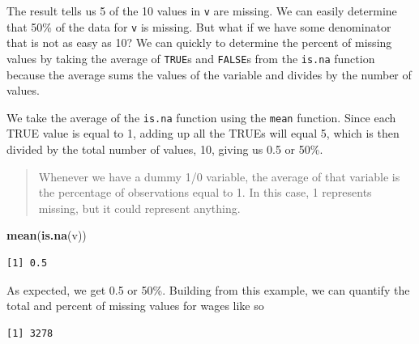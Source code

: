 \documentclass[
]{book}
\makeatletter
\newenvironment{Shaded}{\begin{snugshade}}{\end{snugshade}}
\newcommand{\FunctionTok}[1]{\textcolor[rgb]{0.27,0.27,0.27}{\textbf{#1}}}
\newcommand{\NormalTok}[1]{#1}
\newcommand{\SpecialCharTok}[1]{\textcolor[rgb]{0.43,0.43,0.43}{\textbf{#1}}}
\newenvironment{kframe}{%
\medskip{}
\setlength{\fboxsep}{.8em}
 \def\at@end@of@kframe{}%
 \ifinner\ifhmode%
  \def\at@end@of@kframe{\end{minipage}}%
  \begin{minipage}{\columnwidth}%
 \fi\fi%
 \def\FrameCommand##1{\hskip\@totalleftmargin \hskip-\fboxsep
 \colorbox{shadecolor}{##1}\hskip-\fboxsep
     \hskip-\linewidth \hskip-\@totalleftmargin \hskip\columnwidth}%
 \MakeFramed {\advance\hsize-\width
   \@totalleftmargin\z@ \linewidth\hsize
   \@setminipage}}%
 {\par\unskip\endMakeFramed%
 \at@end@of@kframe}
\renewenvironment{Shaded}{\begin{kframe}}{\end{kframe}}
\makeatother
\begin{document}
The result tells us 5 of the 10 values in \texttt{v} are missing. We can easily determine that 50\% of the data for \texttt{v} is missing. But what if we have some denominator that is not as easy as 10? We can quickly to determine the percent of missing values by taking the average of \texttt{TRUE}s and \texttt{FALSE}s from the \texttt{is.na} function because the average sums the values of the variable and divides by the number of values.

We take the average of the \texttt{is.na} function using the \texttt{mean} function. Since each TRUE value is equal to 1, adding up all the TRUEs will equal 5, which is then divided by the total number of values, 10, giving us 0.5 or 50\%.

\begin{quote}
Whenever we have a dummy 1/0 variable, the average of that variable is the percentage of observations equal to 1. In this case, 1 represents missing, but it could represent anything.
\end{quote}

\begin{Shaded}
\begin{Highlighting}[]
\FunctionTok{mean}\NormalTok{(}\FunctionTok{is.na}\NormalTok{(v))}
\end{Highlighting}
\end{Shaded}

\begin{verbatim}
[1] 0.5
\end{verbatim}

As expected, we get 0.5 or 50\%. Building from this example, we can quantify the total and percent of missing values for wages like so

\begin{Shaded}
\end{Shaded}

\begin{verbatim}
[1] 3278
\end{verbatim}

\begin{Shaded}
\end{Shaded}
\end{document}
